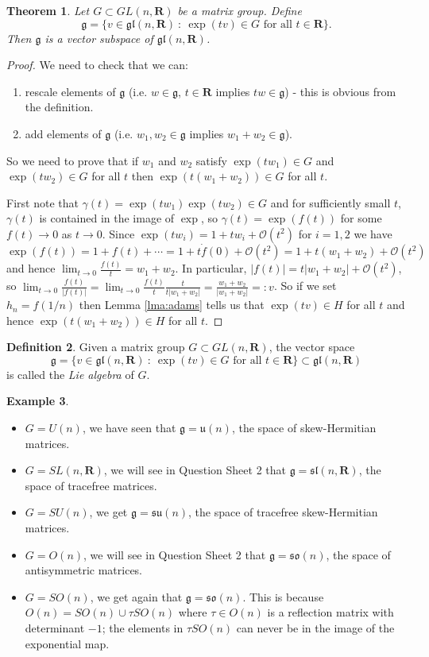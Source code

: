 \documentclass[12pt]{article}
\newcommand{\RR}{\mathbf{R}}
\newtheorem{thm}{Theorem}[section]
\theoremstyle{definition}
\newtheorem{dfn}[thm]{Definition}
\newtheorem{exm}[thm]{Example}
\theoremstyle{check}
\theoremstyle{remark}
\theoremstyle{TheoremNum}
\begin{document}
\begin{thm}
Let $G\subset GL(n,\RR)$ be a matrix group. Define
\[\mathfrak{g}=\{v\in\mathfrak{gl}(n,\RR)\ :\ \exp(tv)\in G\mbox{ for all }t\in\RR\}.\]
Then $\mathfrak{g}$ is a vector subspace of $\mathfrak{gl}(n,\RR)$.
\end{thm}
\begin{proof}
We need to check that we can:
\begin{enumerate}
\item rescale elements of $\mathfrak{g}$ (i.e. $w\in\mathfrak{g}$, $t\in\RR$ implies $tw\in \mathfrak{g}$) - this is obvious from the definition.
\item add elements of $\mathfrak{g}$ (i.e. $w_1,w_2\in \mathfrak{g}$ implies $w_1+w_2\in \mathfrak{g}$).
\end{enumerate}
So we need to prove that if $w_1$ and $w_2$ satisfy $\exp(tw_1)\in G$ and $\exp(tw_2)\in G$ for all $t$ then $\exp(t(w_1+w_2))\in G$ for all $t$.

First note that $\gamma(t)=\exp(tw_1)\exp(tw_2)\in G$ and for sufficiently small $t$, $\gamma(t)$ is contained in the image of $\exp$, so $\gamma(t)=\exp(f(t))$ for some $f(t)\to 0$ as $t\to 0$. Since $\exp(tw_i)=1+tw_i+\mathcal{O}(t^2)$ for $i=1,2$ we have
\[\exp(f(t))=1+f(t)+\cdots=1+t\dot{f}(0)+\mathcal{O}(t^2)=1+t(w_1+w_2)+\mathcal{O}(t^2)\]
and hence $\lim_{t\to 0}\frac{f(t)}{t}=w_1+w_2$. In particular, $|f(t)|=t|w_1+w_2|+\mathcal{O}(t^2)$, so $\lim_{t\to 0}\frac{f(t)}{|f(t)|}=\lim_{t\to 0}\frac{f(t)}{t}\frac{t}{t|w_1+w_2|}=\frac{w_1+w_2}{|w_1+w_2|}=:v$. So if we set $h_n=f(1/n)$ then Lemma \ref{lma:adams} tells us that $\exp(tv)\in H$ for all $t$ and hence $\exp(t(w_1+w_2))\in H$ for all $t$.
\end{proof}

\begin{dfn}
Given a matrix group $G\subset GL(n,\RR)$, the vector space
\[\mathfrak{g}=\{v\in\mathfrak{gl}(n,\RR)\ :\ \exp(tv)\in G\mbox{ for all }t\in\RR\}\subset\mathfrak{gl}(n,\RR)\]
is called the {\em Lie algebra} of $G$.
\end{dfn}

\begin{exm}
\begin{itemize}
\item $G=U(n)$, we have seen that $\mathfrak{g}=\mathfrak{u}(n)$, the space of skew-Hermitian matrices.
\item $G=SL(n,\RR)$, we will see in Question Sheet 2 that $\mathfrak{g}=\mathfrak{sl}(n,\RR)$, the space of tracefree matrices.
\item $G=SU(n)$, we get $\mathfrak{g}=\mathfrak{su}(n)$, the space of tracefree skew-Hermitian matrices.
\item $G=O(n)$, we will see in Question Sheet 2 that $\mathfrak{g}=\mathfrak{so}(n)$, the space of antisymmetric matrices.
\item $G=SO(n)$, we get again that $\mathfrak{g}=\mathfrak{so}(n)$. This is because $O(n)=SO(n)\cup\tau SO(n)$ where $\tau\in O(n)$ is a reflection matrix with determinant $-1$; the elements in $\tau SO(n)$ can never be in the image of the exponential map.
\end{itemize}
\end{exm}
\end{document}
